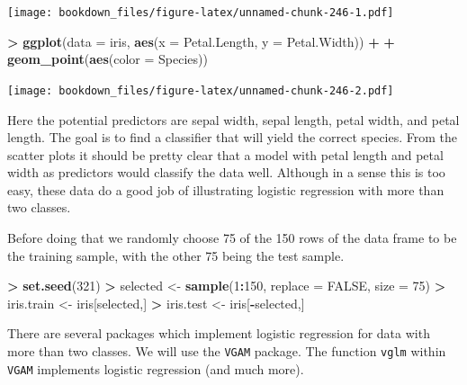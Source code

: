 \documentclass[]{krantz}
\makeatletter
\newenvironment{Shaded}{\begin{snugshade}}{\end{snugshade}}
\newcommand{\KeywordTok}[1]{\textcolor[rgb]{0.27,0.27,0.27}{\textbf{#1}}}
\newcommand{\DataTypeTok}[1]{\textcolor[rgb]{0.27,0.27,0.27}{#1}}
\newcommand{\DecValTok}[1]{\textcolor[rgb]{0.06,0.06,0.06}{#1}}
\newcommand{\StringTok}[1]{\textcolor[rgb]{0.5,0.5,0.5}{#1}}
\newcommand{\OtherTok}[1]{\textcolor[rgb]{0.37,0.37,0.37}{#1}}
\newcommand{\OperatorTok}[1]{\textcolor[rgb]{0.43,0.43,0.43}{\textbf{#1}}}
\newcommand{\NormalTok}[1]{#1}
\newenvironment{kframe}{%
\medskip{}
\setlength{\fboxsep}{.8em}
 \def\at@end@of@kframe{}%
 \ifinner\ifhmode%
  \def\at@end@of@kframe{\end{minipage}}%
  \begin{minipage}{\columnwidth}%
 \fi\fi%
 \def\FrameCommand##1{\hskip\@totalleftmargin \hskip-\fboxsep
 \colorbox{shadecolor}{##1}\hskip-\fboxsep
     \hskip-\linewidth \hskip-\@totalleftmargin \hskip\columnwidth}%
 \MakeFramed {\advance\hsize-\width
   \@totalleftmargin\z@ \linewidth\hsize
   \@setminipage}}%
 {\par\unskip\endMakeFramed%
 \at@end@of@kframe}
\renewenvironment{Shaded}{\begin{kframe}}{\end{kframe}}
\makeatother
\begin{document}
\texttt{[image: bookdown\_files/figure-latex/unnamed-chunk-246-1.pdf]}

\begin{Shaded}
\begin{Highlighting}[]
\OperatorTok{>}\StringTok{ }\KeywordTok{ggplot}\NormalTok{(}\DataTypeTok{data =}\NormalTok{ iris, }\KeywordTok{aes}\NormalTok{(}\DataTypeTok{x =}\NormalTok{ Petal.Length, }\DataTypeTok{y =}\NormalTok{ Petal.Width)) }\OperatorTok{+}\StringTok{ }
\OperatorTok{+}\StringTok{   }\KeywordTok{geom_point}\NormalTok{(}\KeywordTok{aes}\NormalTok{(}\DataTypeTok{color =}\NormalTok{ Species))}
\end{Highlighting}
\end{Shaded}

\texttt{[image: bookdown\_files/figure-latex/unnamed-chunk-246-2.pdf]}

Here the potential predictors are sepal width, sepal length, petal
width, and petal length. The goal is to find a classifier that will
yield the correct species. From the scatter plots it should be pretty
clear that a model with petal length and petal width as predictors would
classify the data well. Although in a sense this is too easy, these data
do a good job of illustrating logistic regression with more than two
classes.

Before doing that we randomly choose 75 of the 150 rows of the data
frame to be the training sample, with the other 75 being the test
sample.

\begin{Shaded}
\begin{Highlighting}[]
\OperatorTok{>}\StringTok{ }\KeywordTok{set.seed}\NormalTok{(}\DecValTok{321}\NormalTok{)}
\OperatorTok{>}\StringTok{ }\NormalTok{selected <-}\StringTok{ }\KeywordTok{sample}\NormalTok{(}\DecValTok{1}\OperatorTok{:}\DecValTok{150}\NormalTok{, }\DataTypeTok{replace =} \OtherTok{FALSE}\NormalTok{, }\DataTypeTok{size =} \DecValTok{75}\NormalTok{)}
\OperatorTok{>}\StringTok{ }\NormalTok{iris.train <-}\StringTok{ }\NormalTok{iris[selected,]}
\OperatorTok{>}\StringTok{ }\NormalTok{iris.test <-}\StringTok{ }\NormalTok{iris[}\OperatorTok{-}\NormalTok{selected,]}
\end{Highlighting}
\end{Shaded}

There are several packages which implement logistic regression for data
with more than two classes. We will use the \texttt{VGAM} package. The
function \texttt{vglm} within \texttt{VGAM} implements logistic
regression (and much more).
\end{document}
